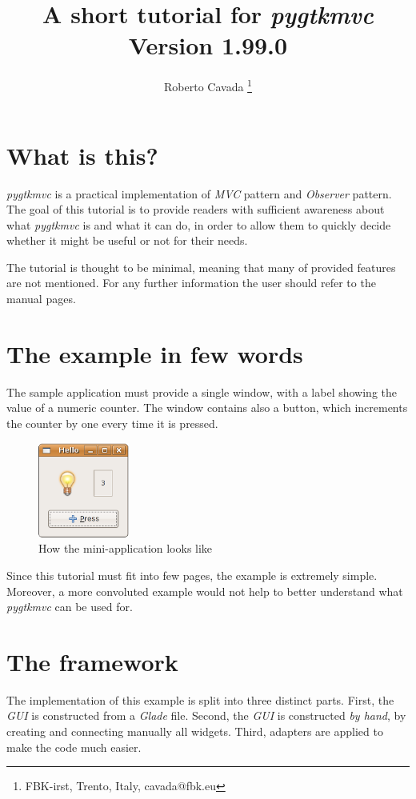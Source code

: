\documentclass{article}
\newcommand{\kw}[1]{\emph{#1}\xspace}
\newcommand{\appl}[1]{\textsl{#1}\xspace}
\newcommand{\glade}{\appl{Glade}}
\newcommand{\mvc}{\kw{MVC} pattern\xspace}
\newcommand{\obs}{\kw{Observer} pattern\xspace}
\newcommand{\gui}{\kw{GUI}}
\newcommand{\pygtkmvc}{\kw{pygtkmvc}}
\begin{document}
\title{A short tutorial for \pygtkmvc\\
Version 1.99.0}

\author{ Roberto Cavada \thanks{FBK-irst, Trento, Italy,
 cavada@fbk.eu} }

\maketitle

\tableofcontents
\newpage

\section{What is this?}
\pygtkmvc is a practical implementation of \mvc and \obs. The goal of
this tutorial is to provide readers with sufficient awareness about
what \pygtkmvc is and what it can do, in order to allow them to
quickly decide whether it might be useful or not for their needs.

The tutorial is thought to be minimal, meaning that many of provided
features are not mentioned. For any further information the user
should refer to the manual pages.


\section{The example in few words}
The sample application must provide a single window, with a label
showing the value of a numeric counter. The window contains also a
button, which increments the counter by one every time it is pressed.

\begin{figure}[htbp]
\begin{center}
\includegraphics[width=3cm]{png/appl.png}
\caption{How the mini-application looks like}
\end{center}
\end{figure}


Since this tutorial must fit into few pages, the example is extremely
simple. Moreover, a more convoluted example would not help to better
understand what \pygtkmvc can be used for.


\section{The framework}
The implementation of this example is split into three distinct
parts. First, the \gui is constructed from a \glade file. Second,
the \gui is constructed \emph{by hand}, by creating and connecting
manually all widgets. Third, adapters are applied to make the code
much easier.
\end{document}
